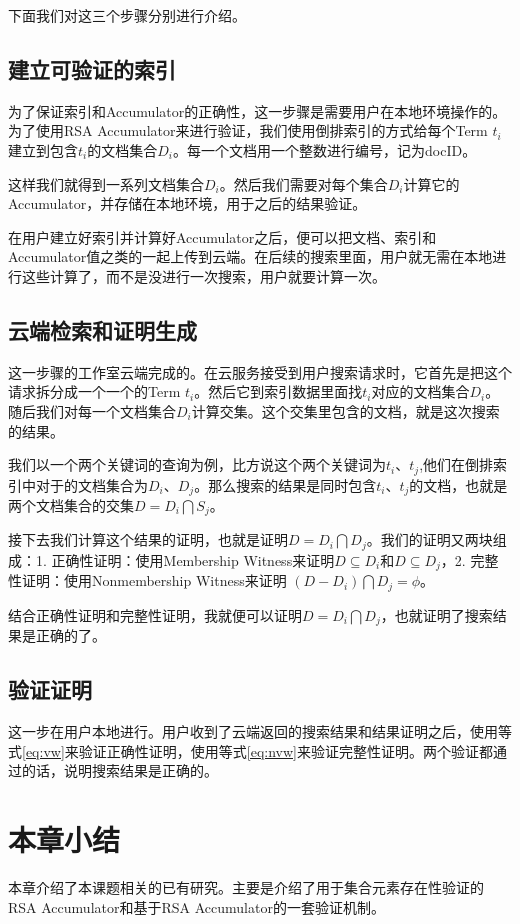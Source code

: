 下面我们对这三个步骤分别进行介绍。
\subsection{建立可验证的索引}
为了保证索引和Accumulator的正确性，这一步骤是需要用户在本地环境操作的。为了使用RSA Accumulator来进行验证，我们使用倒排索引的方式给每个Term $t_i$建立到包含$t_i$的文档集合$D_i$。每一个文档用一个整数进行编号，记为docID。

这样我们就得到一系列文档集合$D_i$。然后我们需要对每个集合$D_i$计算它的Accumulator，并存储在本地环境，用于之后的结果验证。

在用户建立好索引并计算好Accumulator之后，便可以把文档、索引和Accumulator值之类的一起上传到云端。在后续的搜索里面，用户就无需在本地进行这些计算了，而不是没进行一次搜索，用户就要计算一次。

\subsection{云端检索和证明生成}
这一步骤的工作室云端完成的。在云服务接受到用户搜索请求时，它首先是把这个请求拆分成一个一个的Term $t_i$。然后它到索引数据里面找$t_i$对应的文档集合$D_i$。随后我们对每一个文档集合$D_i$计算交集。这个交集里包含的文档，就是这次搜索的结果。

我们以一个两个关键词的查询为例，比方说这个两个关键词为$t_i$、$t_j$,他们在倒排索引中对于的文档集合为$D_i$、$D_j$。那么搜索的结果是同时包含$t_i$、$t_j$的文档，也就是两个文档集合的交集$D = D_i \bigcap S_j$。

接下去我们计算这个结果的证明，也就是证明$D = D_i \bigcap D_j$。我们的证明又两块组成：1. 正确性证明：使用Membership Witness来证明$D \subseteq D_i$和$D \subseteq D_j$，2. 完整性证明：使用Nonmembership Witness来证明 $(D - D_i) \bigcap D_j = \phi$。

结合正确性证明和完整性证明，我就便可以证明$D = D_i \bigcap D_j$，也就证明了搜索结果是正确的了。

\subsection{验证证明}
这一步在用户本地进行。用户收到了云端返回的搜索结果和结果证明之后，使用等式\ref{eq:vw}来验证正确性证明，使用等式\ref{eq:nvw}来验证完整性证明。两个验证都通过的话，说明搜索结果是正确的。

\section{本章小结}
本章介绍了本课题相关的已有研究。主要是介绍了用于集合元素存在性验证的RSA Accumulator和基于RSA Accumulator的一套验证机制。
